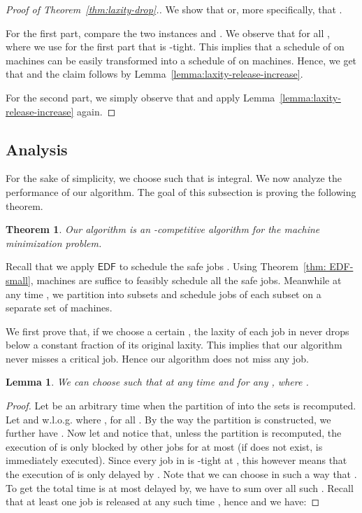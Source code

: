 \documentclass[letterpaper,11pt]{article}
\newtheorem{theorem}{Theorem}
\newtheorem{lemma}{Lemma}
\newcommand{\EDF}{\ensuremath{\mathsf{EDF}}\xspace}
\begin{document}
\begin{proof}[Proof of Theorem~\ref{thm:laxity-drop}.]
We show that  or, more specifically, that . 

For the first part, compare the two instances  and . We observe that  for all , where we use for the first part that  is -tight. This implies that a schedule of  on  machines can be easily transformed into a schedule of  on  machines. Hence, we get that  and the claim follows by Lemma~\ref{lemma:laxity-release-increase}.

For the second part, we simply observe that  and apply Lemma~\ref{lemma:laxity-release-increase} again.
\end{proof}

\subsection{Analysis} \label{subsec: oa-analysis}

For the sake of simplicity, we choose  such that  is integral. We now analyze the performance of our algorithm. The goal of this subsection is proving the following theorem.

\begin{theorem}\label{thm:logn}
Our algorithm is an -competitive algorithm for the machine minimization problem.
\end{theorem}

Recall that we apply \EDF to schedule the safe jobs . Using Theorem~\ref{thm: EDF-small},  machines are suffice to feasibly schedule all the safe jobs. Meanwhile at any time , we partition  into  subsets  and schedule  jobs of each subset on a separate set of machines.

We first prove that, if we choose a certain , the laxity of each job in  never drops below a constant fraction of its original laxity. This implies that our algorithm never misses a critical job. Hence our algorithm does not miss any job.

\begin{lemma}\label{lemma:length-preempted}
We can choose  such that at any time  and for any ,  where .
\end{lemma}
\begin{proof}
Let  be an arbitrary time when the partition of  into the sets  is recomputed. Let  and w.l.o.g.  where , for all . By the way the partition is constructed, we further have . Now let  and notice that, unless the partition is recomputed, the execution of  is only blocked by other jobs for at most  (if  does not exist,  is immediately executed). Since every job in  is -tight at , this however means that the execution of  is only delayed by . Note that we can choose  in such a way that . To get the total time  is at most delayed by, we have to sum over all such . Recall that at least one job is released at any such time , hence  and we have: \end{proof}
\end{document}
